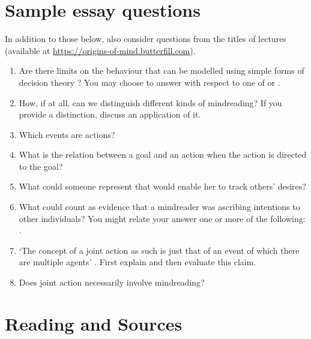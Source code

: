 \documentclass[12pt,\papersize]{extarticle}
\begin{document}
\section{Sample essay questions}
In addition to those below, also consider questions from the titles of lectures (available  at \url{https://origins-of-mind.butterfill.com}).
%
\begin{enumerate}
\item Are there limits on the behaviour that can be modelled using simple forms of decision theory \citep[such as the version presented in][]{Jeffrey:1983oe}?  You may choose to answer with respect to one of \citet{Sugden:2000mw} or \citet{bratman:2000_valuing}.
\item How, if at all, can we distinguish different kinds of mindreading?  If you provide a distinction, discuss an application of it.
\item Which events are actions?
\item What is the relation between a goal and an action when the action is directed to the goal?
\item What could someone represent that would enable her to track others' desires?
\item What could count as evidence that a mindreader was ascribing intentions to other individuals?  You might relate your answer one or more of the following: \citet{fogassi_mirror_2007,Dasser:1989qw,astington:2001_paradox,malle:2001_distinction}.
\item `The concept of a joint action as such is just that of an event of which there are multiple agents' \citep[p.\ 366]{ludwig_collective_2007}.  First explain and then evaluate this claim.
\item Does joint action necessarily involve mindreading?
\end{enumerate}



\section{Reading and Sources}

{
	\def\section*#1{}	%
	
}
\end{document}
